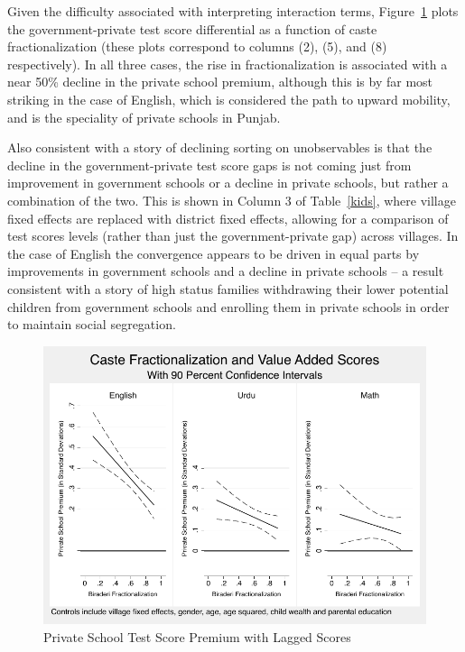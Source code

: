 \documentclass[12pt]{article}
\begin{document}
Given the difficulty associated with interpreting interaction terms, Figure~\ref{kidscombined} plots the government-private test score differential as a function of caste fractionalization (these plots correspond to columns (2), (5), and (8) respectively). In all three cases, the rise in fractionalization is associated with a near 50\% decline in the private school premium, although this is by far most striking in the case of English, which is considered the path to upward mobility, and is the speciality of private schools in Punjab. 

Also consistent with a story of declining sorting on unobservables is that the decline in the government-private test score gaps is not coming just from improvement in government schools or a decline in private schools, but rather a combination of the two. This is shown in Column 3 of Table~\ref{kids}, where village fixed effects are replaced with district fixed effects, allowing for a comparison of test scores levels (rather than just the government-private gap) across villages. In the case of English the convergence appears to be driven in equal parts by improvements in government schools and a decline in private schools -- a result consistent with a story of high status families withdrawing their lower potential children from government schools and enrolling them in private schools in order to maintain social segregation. 

\begin{figure}[h]
	\caption{Private School Test Score Premium with Lagged Scores}\label{kidscombined}
	\centering	
	\includegraphics[scale=0.8]{graphs/kids_combined.pdf}
\end{figure}
\end{document}
